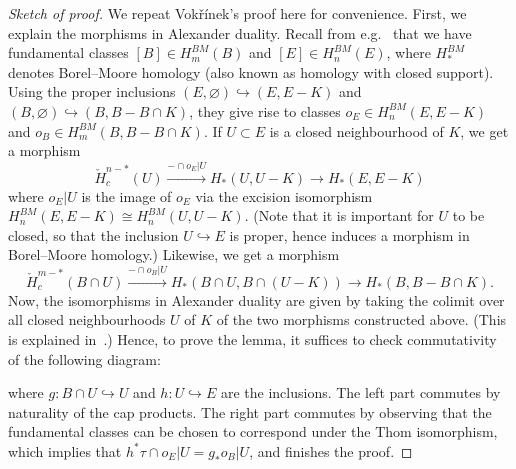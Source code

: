 \documentclass[a4paper]{amsart}
\newcommand{\lra}{\longrightarrow}
\theoremstyle{plain}
\theoremstyle{definition}
\newcommand{\BMH}{H^{BM}}
\newcommand{\CCH}{\check{H}_{c}}
\let\emptyset\varnothing
\begin{document}
\begin{proof}[Sketch of proof]
We repeat Vok\v{r}\'{i}nek's proof here for convenience. First, we explain the morphisms in Alexander duality. Recall from e.g.~\cite[Corollary V.10.2]{bredon_sheaf_1997} that we have fundamental classes $[B] \in \BMH_m(B)$ and $[E] \in \BMH_n(E)$, where $\BMH_*$ denotes Borel--Moore homology (also known as homology with closed support). Using the proper inclusions $(E,\emptyset) \hookrightarrow (E, E-K)$ and $(B,\emptyset) \hookrightarrow (B, B - B\cap K)$, they give rise to classes $o_E \in \BMH_n(E, E-K)$ and $o_B \in \BMH_m(B, B- B\cap K)$. If $U \subset E$ is a closed neighbourhood of $K$, we get a morphism
\[
    \CCH^{n-*}(U) \overset{- \cap o_E|U}{\lra} H_*(U, U-K) \lra H_*(E, E-K)
\]
where $o_E|U$ is the image of $o_E$ via the excision isomorphism $\BMH_n(E, E-K) \cong \BMH_n(U, U-K)$. (Note that it is important for $U$ to be closed, so that the inclusion $U \hookrightarrow E$ is proper, hence induces a morphism in Borel--Moore homology.) Likewise, we get a morphism
\[
    \CCH^{m-*}(B \cap U) \overset{- \cap o_B|U}{\lra} H_*(B \cap U, B \cap (U-K)) \lra H_*(B, B- B\cap K).
\]
Now, the isomorphisms in Alexander duality are given by taking the colimit over all closed neighbourhoods $U$ of $K$ of the two morphisms constructed above. (This is explained in~\cite[V.9]{bredon_sheaf_1997}.) Hence, to prove the lemma, it suffices to check commutativity of the following diagram:
\begin{center}
\end{center}
where $g \colon B \cap U \hookrightarrow U$ and $h \colon U \hookrightarrow E$ are the inclusions. The left part commutes by naturality of the cap products. The right part commutes by observing that the fundamental classes can be chosen to correspond under the Thom isomorphism, which implies that $h^*\tau \cap o_E|U = g_* o_B|U$, and finishes the proof.
\end{proof}
\end{document}
